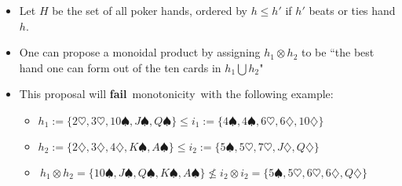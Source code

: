 \begin{itemize}
    \item Let $H$ be the set of all poker hands, ordered by $h \leq h'$ if $h'$ beats or ties hand $h$.
    \item One can propose a monoidal product by assigning $h_1 \otimes h_2$ to be ``the best hand one can form out of the ten cards in $h_1 \bigcup h_2$"
    \item This proposal will \textbf{fail} \,monotonicity\, with the following example:
          \begin{itemize}
            \item $h_1 := \{2\heartsuit, 3\heartsuit,10 \spadesuit,J\spadesuit,Q\spadesuit\} \leq i_1 := \{4\spadesuit,4\spadesuit,6\heartsuit,6\diamondsuit,10\diamondsuit\}$
            \item $h_2 := \{2\diamondsuit,3\diamondsuit,4\diamondsuit,K\spadesuit,A\spadesuit\} \leq i_2 := \{5\spadesuit,5\heartsuit,7\heartsuit,J\diamondsuit,Q\diamondsuit\}$
            \item \,$h_1 \otimes h_2=\{10\spadesuit,J\spadesuit,Q\spadesuit,K\spadesuit,A\spadesuit\} \not \leq i_2 \otimes i_2 = \{5\spadesuit, 5\heartsuit,6\heartsuit,6\diamondsuit,Q\diamondsuit\}$\,
          \end{itemize}
  \end{itemize}
  